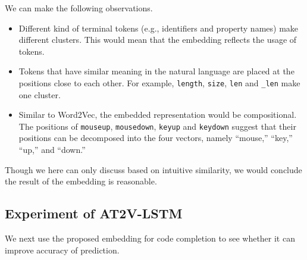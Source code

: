 \documentclass[E]{compsoft}
\begin{document}
We can make the following observations.
\begin{itemize}
\item Different kind of terminal tokens (e.g., identifiers and property names) make different clusters.  This would mean that the embedding reflects the usage of tokens.
\item Tokens that have similar meaning in the natural language are placed at the positions close to each other.  For example, \texttt{length}, \texttt{size}, \texttt{len} and \verb|_len| make one cluster.
\item Similar to Word2Vec, the embedded representation would be compositional.
  The positions of \texttt{mouseup}, \texttt{mousedown}, \texttt{keyup} and \texttt{keydown} suggest that their positions can be decomposed into the four vectors, namely ``mouse,'' ``key,'' ``up,'' and ``down.''
\end{itemize}
Though we here can only discuss based on intuitive similarity, we would conclude the result of the embedding is reasonable.





\subsection{Experiment of AT2V-LSTM}
We next use the proposed embedding for code completion to see whether it can improve accuracy of prediction.
\end{document}
